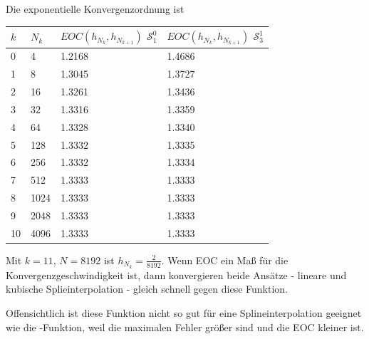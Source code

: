 \documentclass[ngerman,a4paper]{texmf/tex/latex/mathscript/mathscript}
\begin{document}
	Die exponentielle Konvergenzordnung ist
	\begin{center}
		\begin{tabular}{ll|l|l}
			$k$ & $N_k$ & $EOC(h_{N_k},h_{N_{k+1}})$ $\mathcal{S}_1^0$ & $EOC(h_{N_k},h_{N_{k+1}})$ $\mathcal{S}_3^1$ \\
			\hline
			0 & 4 & 1.2168 & 1.4686  \\
			\hline
			1 & 8 & 1.3045 & 1.3727\\
			\hline
			2 & 16 & 1.3261 & 1.3436 \\
			\hline
			3 & 32 & 1.3316 & 1.3359 \\
			\hline
			4 & 64 & 1.3328 & 1.3340 \\
			\hline
			5 & 128 & 1.3332 & 1.3335 \\
			\hline
			6 & 256 & 1.3332 & 1.3334 \\
			\hline
			7 & 512 & 1.3333 & 1.3333 \\
			\hline
			8 & 1024 & 1.3333 & 1.3333 \\
			\hline
			9 & 2048 & 1.3333 & 1.3333 \\
			\hline
			10 & 4096 & 1.3333 & 1.3333 \\
			\hline
		\end{tabular}
	\end{center}
	
	Mit $k=11$, $N=8192$ ist $h_{N_k}= \frac{2}{8192}$. Wenn EOC ein Maß für die Konvergenzgeschwindigkeit ist, dann konvergieren beide Ansätze - lineare und kubische Splieinterpolation - gleich schnell gegen diese Funktion.
	
	Offensichtlich ist diese Funktion nicht so gut für eine Splineinterpolation geeignet wie die -Funktion, weil die maximalen Fehler größer sind und die EOC kleiner ist.
\end{document}
